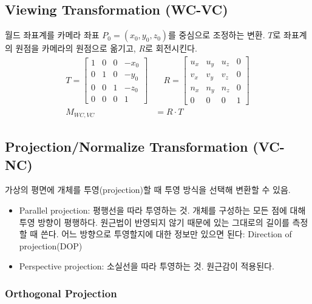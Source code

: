 \subsection{Viewing Transformation (WC-VC)}

월드 좌표계를 카메라 좌표 $P_0 = (x_0, y_0, z_0)$를 중심으로 조정하는 변환. $T$로 좌표계의 원점을 카메라의 원점으로 옮기고, $R$로 회전시킨다.
$$
\begin{aligned}
  T =
  \begin{bmatrix}
    1 & 0 & 0 & -x_0 \\
    0 & 1 & 0 & -y_0 \\
    0 & 0 & 1 & -z_0 \\
    0 & 0 & 0 & 1
  \end{bmatrix}
  &\quad
  R =
  \begin{bmatrix}
    u_x & u_y & u_z & 0 \\
    v_x & v_y & v_z & 0 \\
    n_x & n_y & n_z & 0 \\
    0 & 0 & 0 & 1
  \end{bmatrix} \\
  M_{WC, VC} &= R \cdot T
\end{aligned}
$$

\subsection{Projection/Normalize Transformation (VC-NC)}

가상의 평면에 개체를 투영(projection)할 때 투영 방식을 선택해 변환할 수 있음.
\begin{itemize}
  \item Parallel projection: 평행선을 따라 투영하는 것. 개체를 구성하는 모든 점에 대해 투영 방향이 평행하다. 원근법이 반영되지 않기 때문에 있는 그대로의 길이를 측정할 때 쓴다. 어느 방향으로 투영할지에 대한 정보만 있으면 된다: Direction of projection(DOP)
  \item Perspective projection: 소실선을 따라 투영하는 것. 원근감이 적용된다.
\end{itemize}

\subsubsection{Orthogonal Projection}


